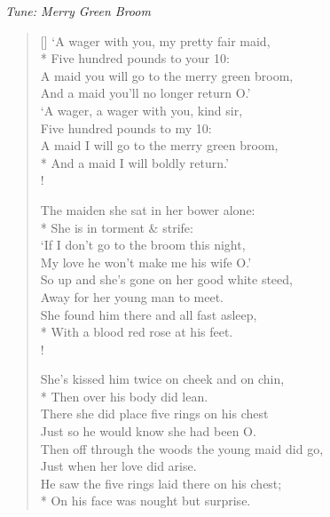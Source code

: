 \documentclass[MAIN]{subfiles}
\begin{document}
\bigskip

\begin{center}
{\it Tune: Merry Green Broom}
\end{center}

\bigskip

\settowidth{\versewidth}{A maid you will go to the merry green}
\begin{verse}[\versewidth]
`A wager with you, my pretty fair maid,\\*
\vin Five hundred pounds to your 10:\\
A maid you will go to the merry green broom,\\
\vin And a maid you'll no longer return O.'\\
`A wager, a wager with you, kind sir,\\
\vin Five hundred pounds to my 10:\\
A maid I will go to the merry green broom,\\*
\vin And a maid I will boldly return.'\\!

The maiden she sat in her bower alone:\\*
\vin She is in torment \& strife:\\
`If I don't go to the broom this night,\\
\vin My love he won't make me his wife O.'\\
So up and she's gone on her good white steed,\\
\vin Away for her young man to meet.\\
She found him there and all fast asleep,\\*
\vin With a blood red rose at his feet.\\!

She's kissed him twice on cheek and on chin,\\*
\vin Then over his body did lean.\\
There she did place five rings on his chest\\
\vin Just so he would know she had been O.\\
Then off through the woods the young maid did go,\\
\vin Just when her love did arise.\\
He saw the five rings laid there on his chest;\\*
\vin On his face was nought but surprise.
\end{verse}
\end{document}
